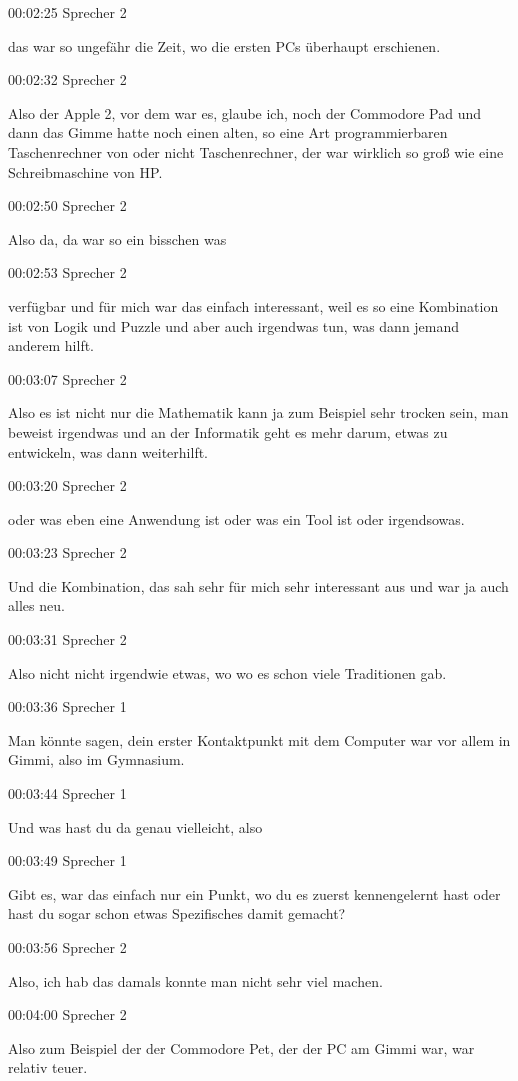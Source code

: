 00:02:25 Sprecher 2

das war so ungefähr die Zeit, wo die ersten PCs überhaupt erschienen.

00:02:32 Sprecher 2

Also der Apple 2, vor dem war es, glaube ich, noch der Commodore Pad und
dann das Gimme hatte noch einen alten, so eine Art programmierbaren
Taschenrechner von oder nicht Taschenrechner, der war wirklich so groß
wie eine Schreibmaschine von HP.

00:02:50 Sprecher 2

Also da, da war so ein bisschen was

00:02:53 Sprecher 2

verfügbar und für mich war das einfach interessant, weil es so eine
Kombination ist von Logik und Puzzle und aber auch irgendwas tun, was
dann jemand anderem hilft.

00:03:07 Sprecher 2

Also es ist nicht nur die Mathematik kann ja zum Beispiel sehr trocken
sein, man beweist irgendwas und an der Informatik geht es mehr darum,
etwas zu entwickeln, was dann weiterhilft.

00:03:20 Sprecher 2

oder was eben eine Anwendung ist oder was ein Tool ist oder irgendsowas.

00:03:23 Sprecher 2

Und die Kombination, das sah sehr für mich sehr interessant aus und war
ja auch alles neu.

00:03:31 Sprecher 2

Also nicht nicht irgendwie etwas, wo wo es schon viele Traditionen gab.

00:03:36 Sprecher 1

Man könnte sagen, dein erster Kontaktpunkt mit dem Computer war vor
allem in Gimmi, also im Gymnasium.

00:03:44 Sprecher 1

Und was hast du da genau vielleicht, also

00:03:49 Sprecher 1

Gibt es, war das einfach nur ein Punkt, wo du es zuerst kennengelernt
hast oder hast du sogar schon etwas Spezifisches damit gemacht?

00:03:56 Sprecher 2

Also, ich hab das damals konnte man nicht sehr viel machen.

00:04:00 Sprecher 2

Also zum Beispiel der der Commodore Pet, der der PC am Gimmi war, war
relativ teuer.

